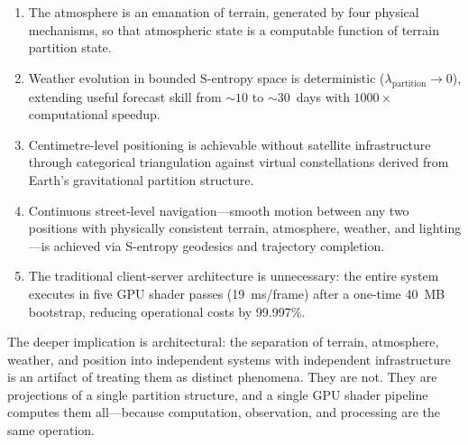 \documentclass[10pt,twocolumn]{article}
\theoremstyle{definition}
\theoremstyle{remark}
\begin{document}
\begin{enumerate}[leftmargin=*,itemsep=2pt]
\item The atmosphere is an emanation of terrain, generated by
  four physical mechanisms, so that atmospheric state is a
  computable function of terrain partition state.

\item Weather evolution in bounded S-entropy space is
  deterministic ($\lambda_{\mathrm{partition}}\to 0$),
  extending useful forecast skill from ${\sim}10$ to
  ${\sim}30$~days with $1000\times$ computational speedup.

\item Centimetre-level positioning is achievable without
  satellite infrastructure through categorical triangulation
  against virtual constellations derived from Earth's
  gravitational partition structure.

\item Continuous street-level navigation---smooth motion
  between any two positions with physically consistent terrain,
  atmosphere, weather, and lighting---is achieved via S-entropy
  geodesics and trajectory completion.

\item The traditional client-server architecture is unnecessary:
  the entire system executes in five GPU shader passes
  (19~ms/frame) after a one-time 40~MB bootstrap, reducing
  operational costs by 99.997\%.
\end{enumerate}

The deeper implication is architectural: the separation of
terrain, atmosphere, weather, and position into independent
systems with independent infrastructure is an artifact of
treating them as distinct phenomena.  They are not.  They are
projections of a single partition structure, and a single GPU
shader pipeline computes them all---because computation,
observation, and processing are the same operation.



\end{document}
